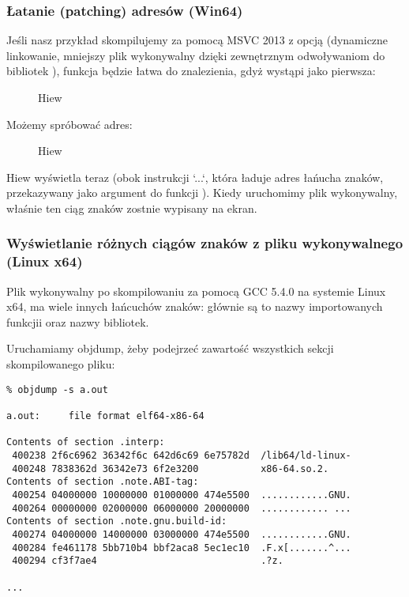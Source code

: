 \subsubsection{Łatanie (patching) adresów (Win64)}

Jeśli nasz przykład skompilujemy za pomocą MSVC 2013 z opcją 
(dynamiczne linkowanie, mniejszy plik wykonywalny dzięki zewnętrznym odwoływaniom do bibliotek ),
funkcja \main będzie łatwa do znalezienia, gdyż wystąpi jako pierwsza:

\begin{figure}[H]
\centering
{}
\caption{Hiew}
\label{}
\end{figure}

Możemy spróbować  adres:

\begin{figure}[H]
\centering
{}
\caption{Hiew}
\label{}
\end{figure}

Hiew wyświetla teraz  (obok instrukcji `\LEA \RCX ...`, która ładuje adres łańucha znaków, przekazywany jako argument do funkcji \printf).
Kiedy uruchomimy plik wykonywalny, właśnie ten ciąg znaków zostnie wypisany na ekran.

\subsubsection{Wyświetlanie różnych ciągów znaków z pliku wykonywalnego (Linux x64)}

Plik wykonywalny po skompilowaniu za pomocą GCC 5.4.0 na systemie Linux x64, ma wiele innych łańcuchów znaków:
głównie są to nazwy importowanych funkcjii oraz nazwy bibliotek.

Uruchamiamy objdump, żeby podejrzeć zawartość wszystkich sekcji skompilowanego pliku:

\begin{lstlisting}
% objdump -s a.out

a.out:     file format elf64-x86-64

Contents of section .interp:
 400238 2f6c6962 36342f6c 642d6c69 6e75782d  /lib64/ld-linux-
 400248 7838362d 36342e73 6f2e3200           x86-64.so.2.
Contents of section .note.ABI-tag:
 400254 04000000 10000000 01000000 474e5500  ............GNU.
 400264 00000000 02000000 06000000 20000000  ............ ...
Contents of section .note.gnu.build-id:
 400274 04000000 14000000 03000000 474e5500  ............GNU.
 400284 fe461178 5bb710b4 bbf2aca8 5ec1ec10  .F.x[.......^...
 400294 cf3f7ae4                             .?z.

...
\end{lstlisting}

